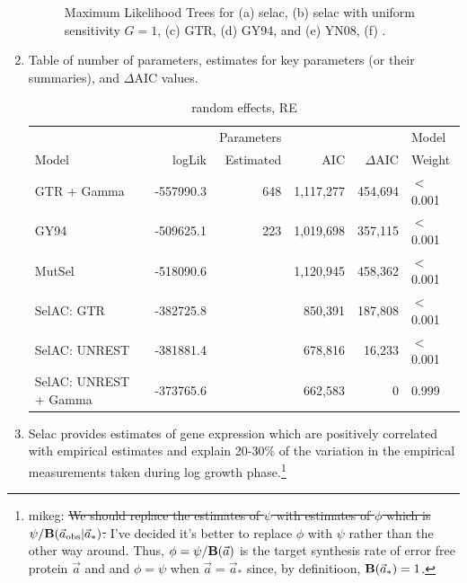 \documentclass{article}
\newcommand{\DeltaAIC}{\ensuremath{\Delta\text{AIC}}\xspace}
\newcommand{\Funcaobsvec}{\ensuremath{\Func(\aobsvec|\aoptvec)}\xspace}
\newcommand{\Func}{\ensuremath{\text{\textbf{B}}}\xspace}
\newcommand{\aobsvec}{\ensuremath{\Vec{a}_{\text{obs}}}\xspace}
\newcommand{\aoptvec}{\ensuremath{\Vec{a}_*}\xspace}
\newcommand{\avec}{\ensuremath{\Vec{a}}\xspace}
\begin{document}
\begin{enumerate}
\begin{figure}[H]
  \qquad
  \caption{Maximum Likelihood Trees for (a) selac, (b) selac with uniform sensitivity $G = 1$, (c) GTR, (d) GY94, and (e) YN08, (f) \citet{LartillotAndPhilippe2004}.}
  \label{fig:MleTrees}
\end{figure}
\item Table of number of parameters, estimates for key parameters (or their summaries), and \DeltaAIC values.
\begin{table}
\begin{tabular}{lrrrrl}
                        &          &Parameters &          &        & Model\\
  Model                 & logLik   & Estimated &     AIC& \DeltaAIC&  Weight\\\hline
  GTR + Gamma           & -557990.3&        648& 1,117,277& 454,694&$<$0.001\\
  GY94                  & -509625.1&        223& 1,019,698& 357,115&$<$0.001\\
  MutSel                & -518090.6&           & 1,120,945& 458,362&$<$0.001\\
  SelAC: GTR            & -382725.8&           &   850,391& 187,808&$<$0.001\\
  SelAC: UNREST         & -381881.4&           &   678,816&  16,233&$<$0.001\\
  SelAC: UNREST + Gamma & -373765.6&           &   662,583&       0& 0.999
\end{tabular}
\caption{random effects, RE}
\end{table}

\item Selac provides estimates of gene expression which are positively correlated with empirical estimates and explain 20-30\% of the variation in the empirical measurements taken during log growth phase.\footnote{mikeg: \sout{We should replace the estimates of $\psi$ with estimates of $\phi$ which is $\psi/\Funcaobsvec$.} 
I've decided it's better to replace $\phi$ with $\psi$ rather than the other way around.
Thus, $\phi = \psi/\Func(\avec)$ is the target synthesis rate of error free protein $\avec$ and and $\phi = \psi$ when  $\avec = \aoptvec$ since, by definitioon, $\Func(\aoptvec) = 1$.
}


\end{enumerate}
\end{document}
